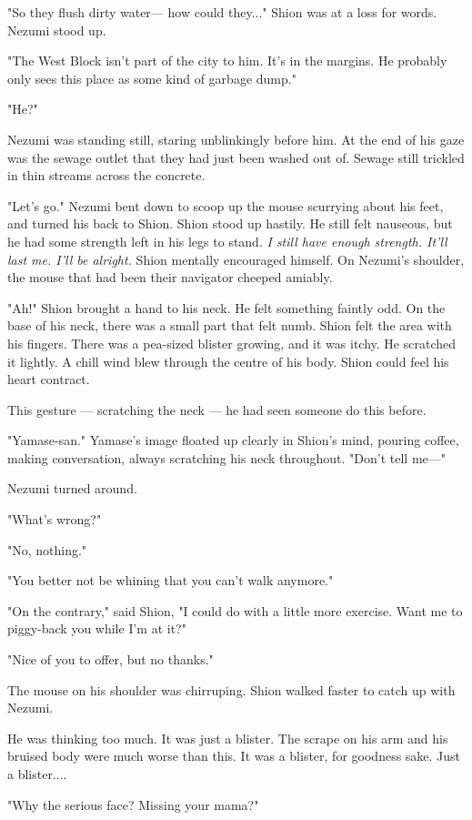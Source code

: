 "So they flush dirty water--- how could they..." Shion was at a loss for
words. Nezumi stood up.

"The West Block isn't part of the city to him. It's in the margins. He
probably only sees this place as some kind of garbage dump."

"He?"

Nezumi was standing still, staring unblinkingly before him. At the end
of his gaze was the sewage outlet that they had just been washed out of.
Sewage still trickled in thin streams across the concrete.

"Let's go." Nezumi bent down to scoop up the mouse scurrying about his
feet, and turned his back to Shion. Shion stood up hastily. He still
felt nauseous, but he had some strength left in his legs to stand. \emph{I
still have enough strength. It'll last me. I'll be alright.} Shion
mentally encouraged himself. On Nezumi's shoulder, the mouse that had
been their navigator cheeped amiably.

"Ah!" Shion brought a hand to his neck. He felt something faintly odd.
On the base of his neck, there was a small part that felt numb. Shion
felt the area with his fingers. There was a pea-sized blister growing,
and it was itchy. He scratched it lightly. A chill wind blew through the
centre of his body. Shion could feel his heart contract.

This gesture --- scratching the neck --- he had seen someone do this before.

"Yamase-san." Yamase's image floated up clearly in Shion's mind, pouring
coffee, making conversation, always scratching his neck throughout.
"Don't tell me---"

Nezumi turned around.

"What's wrong?"

"No, nothing."

"You better not be whining that you can't walk anymore."

"On the contrary," said Shion, "I could do with a little more exercise.
Want me to piggy-back you while I'm at it?"

"Nice of you to offer, but no thanks."

The mouse on his shoulder was chirruping. Shion walked faster to catch
up with Nezumi.

He was thinking too much. It was just a blister. The scrape on his arm
and his bruised body were much worse than this. It was a blister, for
goodness sake. Just a blister....

"Why the serious face? Missing your mama?"

